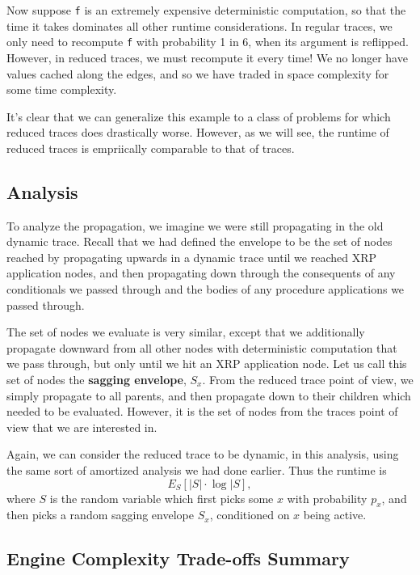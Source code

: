 \documentclass[10pt]{article}
\begin{document}
Now suppose {\tt f} is an extremely expensive deterministic computation, so that the time it takes dominates all other runtime considerations.  In regular traces, we only need to recompute {\tt f} with probability 1 in 6, when its argument is reflipped.   However, in reduced traces, we must recompute it every time!  We no longer have values cached along the edges, and so we have traded in space complexity for some time complexity.

It's clear that we can generalize this example to a class of problems for which reduced traces does drastically worse.  However, as we will see, the runtime of reduced traces is empriically comparable to that of traces.  

\subsection{Analysis}

To analyze the propagation, we imagine we were still propagating in the old dynamic trace.  Recall that we had defined the envelope to be the set of nodes reached by propagating upwards in a dynamic trace until we reached XRP application nodes, and then propagating down through the consequents of any conditionals we passed through and the bodies of any procedure applications we passed through.  

The set of nodes we evaluate is very similar, except that we additionally propagate downward from all other nodes with deterministic computation that we pass through, but only until we hit an XRP application node.  Let us call this set of nodes the {\bf sagging envelope}, $S_x$.  From the reduced trace point of view, we simply propagate to all parents, and then propagate down to their children which needed to be evaluated.  However, it is the set of nodes from the traces point of view that we are interested in.  

Again, we can consider the reduced trace to be dynamic, in this analysis, using the same sort of amortized analysis we had done earlier.  Thus the runtime is
$$ E_{S}[|S| \cdot \log |S], $$
where $S$ is the random variable which first picks some $x$ with probability $p_x$, and then picks a random sagging envelope $S_x$, conditioned on $x$ being active.

\subsection{Engine Complexity Trade-offs Summary}
\end{document}

